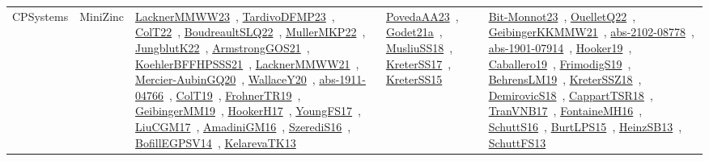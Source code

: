 {\begin{longtable}{lp{3cm}>{\raggedright\arraybackslash}p{6cm}>{\raggedright\arraybackslash}p{6cm}>{\raggedright\arraybackslash}p{8cm}}
CPSystems & MiniZinc & \href{works/LacknerMMWW23.pdf}{LacknerMMWW23}~\cite{LacknerMMWW23}, \href{works/TardivoDFMP23.pdf}{TardivoDFMP23}~\cite{TardivoDFMP23}, \href{works/ColT22.pdf}{ColT22}~\cite{ColT22}, \href{works/BoudreaultSLQ22.pdf}{BoudreaultSLQ22}~\cite{BoudreaultSLQ22}, \href{works/MullerMKP22.pdf}{MullerMKP22}~\cite{MullerMKP22}, \href{works/JungblutK22.pdf}{JungblutK22}~\cite{JungblutK22}, \href{works/ArmstrongGOS21.pdf}{ArmstrongGOS21}~\cite{ArmstrongGOS21}, \href{works/KoehlerBFFHPSSS21.pdf}{KoehlerBFFHPSSS21}~\cite{KoehlerBFFHPSSS21}, \href{works/LacknerMMWW21.pdf}{LacknerMMWW21}~\cite{LacknerMMWW21}, \href{works/Mercier-AubinGQ20.pdf}{Mercier-AubinGQ20}~\cite{Mercier-AubinGQ20}, \href{works/WallaceY20.pdf}{WallaceY20}~\cite{WallaceY20}, \href{works/abs-1911-04766.pdf}{abs-1911-04766}~\cite{abs-1911-04766}, \href{works/ColT19.pdf}{ColT19}~\cite{ColT19}, \href{works/FrohnerTR19.pdf}{FrohnerTR19}~\cite{FrohnerTR19}, \href{works/GeibingerMM19.pdf}{GeibingerMM19}~\cite{GeibingerMM19}, \href{works/HookerH17.pdf}{HookerH17}~\cite{HookerH17}, \href{works/YoungFS17.pdf}{YoungFS17}~\cite{YoungFS17}, \href{works/LiuCGM17.pdf}{LiuCGM17}~\cite{LiuCGM17}, \href{works/AmadiniGM16.pdf}{AmadiniGM16}~\cite{AmadiniGM16}, \href{works/SzerediS16.pdf}{SzerediS16}~\cite{SzerediS16}, \href{works/BofillEGPSV14.pdf}{BofillEGPSV14}~\cite{BofillEGPSV14}, \href{works/KelarevaTK13.pdf}{KelarevaTK13}~\cite{KelarevaTK13} & \href{works/PovedaAA23.pdf}{PovedaAA23}~\cite{PovedaAA23}, \href{works/Godet21a.pdf}{Godet21a}~\cite{Godet21a}, \href{works/MusliuSS18.pdf}{MusliuSS18}~\cite{MusliuSS18}, \href{works/KreterSS17.pdf}{KreterSS17}~\cite{KreterSS17}, \href{works/KreterSS15.pdf}{KreterSS15}~\cite{KreterSS15} & \href{works/Bit-Monnot23.pdf}{Bit-Monnot23}~\cite{Bit-Monnot23}, \href{works/OuelletQ22.pdf}{OuelletQ22}~\cite{OuelletQ22}, \href{works/GeibingerKKMMW21.pdf}{GeibingerKKMMW21}~\cite{GeibingerKKMMW21}, \href{works/abs-2102-08778.pdf}{abs-2102-08778}~\cite{abs-2102-08778}, \href{works/abs-1901-07914.pdf}{abs-1901-07914}~\cite{abs-1901-07914}, \href{works/Hooker19.pdf}{Hooker19}~\cite{Hooker19}, \href{works/Caballero19.pdf}{Caballero19}~\cite{Caballero19}, \href{works/FrimodigS19.pdf}{FrimodigS19}~\cite{FrimodigS19}, \href{works/BehrensLM19.pdf}{BehrensLM19}~\cite{BehrensLM19}, \href{works/KreterSSZ18.pdf}{KreterSSZ18}~\cite{KreterSSZ18}, \href{works/DemirovicS18.pdf}{DemirovicS18}~\cite{DemirovicS18}, \href{works/CappartTSR18.pdf}{CappartTSR18}~\cite{CappartTSR18}, \href{works/TranVNB17.pdf}{TranVNB17}~\cite{TranVNB17}, \href{works/FontaineMH16.pdf}{FontaineMH16}~\cite{FontaineMH16}, \href{works/SchuttS16.pdf}{SchuttS16}~\cite{SchuttS16}, \href{works/BurtLPS15.pdf}{BurtLPS15}~\cite{BurtLPS15}, \href{works/HeinzSB13.pdf}{HeinzSB13}~\cite{HeinzSB13}, \href{works/SchuttFS13.pdf}{SchuttFS13}~\cite{SchuttFS13}\\

\end{longtable}}

